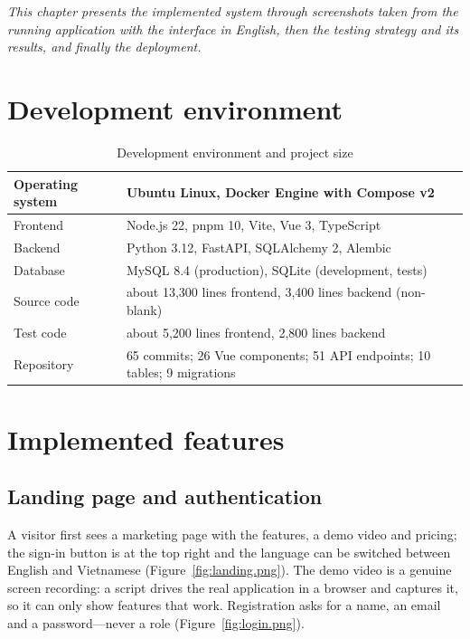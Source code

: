 \documentclass[../main.tex]{subfiles}
\begin{document}
\textit{This chapter presents the implemented system through screenshots taken from the running
application with the interface in English, then the testing strategy and its results, and finally
the deployment.}

\section{Development environment}
\begin{table}[H]
\centering
\caption{Development environment and project size}\label{tab:env}
\renewcommand{\arraystretch}{1.2}
\begin{tabular}{|p{5cm}|p{8.7cm}|}
\hline
Operating system & Ubuntu Linux, Docker Engine with Compose v2 \\ \hline
Frontend & Node.js 22, pnpm 10, Vite, Vue 3, TypeScript \\ \hline
Backend & Python 3.12, FastAPI, SQLAlchemy 2, Alembic \\ \hline
Database & MySQL 8.4 (production), SQLite (development, tests) \\ \hline
Source code & about 13,300 lines frontend, 3,400 lines backend (non-blank) \\ \hline
Test code & about 5,200 lines frontend, 2,800 lines backend \\ \hline
Repository & 65 commits; 26 Vue components; 51 API endpoints; 10 tables; 9 migrations \\ \hline
\end{tabular}
\end{table}

\section{Implemented features}
\subsection{Landing page and authentication}
A visitor first sees a marketing page with the features, a demo video and pricing; the sign-in
button is at the top right and the language can be switched between English and Vietnamese
(Figure~\ref{fig:landing.png}). The demo video is a genuine screen recording: a script drives the
real application in a browser and captures it, so it can only show features that work.
Registration asks for a name, an email and a password---never a role (Figure~\ref{fig:login.png}).

\end{document}
